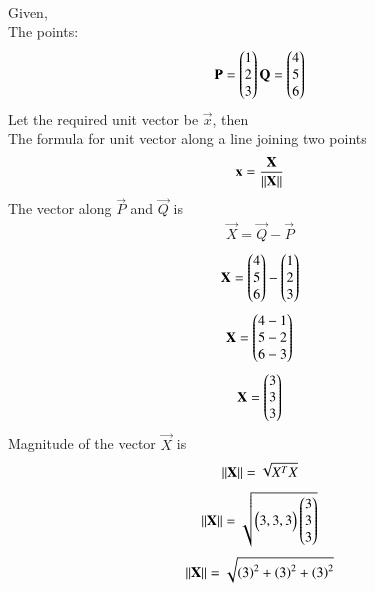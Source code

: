 \documentclass[journal]{IEEEtran}
\begin{document}
         \solution \\
         Given,\\
         The points: 
         \begin{align}
             \mathbf{P}=\begin{pmatrix}1\\2\\3\end{pmatrix} \mathbf{Q}=\begin{pmatrix}4\\5\\6\end{pmatrix}
         \end{align}
         Let the required unit vector be $\vec{x}$, then\\ 
         The formula for unit vector along a line joining two points
         \begin{align}
             \mathbf{{x}}=\frac{\mathbf{X}}{\left\lVert\mathbf{X}\right\rVert}
         \end{align}
         The vector along $\vec{P}$ and $\vec{Q}$ is\\
         \begin{align}
             \vec{X}=\vec{Q}-\vec{P}
         \end{align}
         \begin{align}
             \mathbf{X}=\begin{pmatrix}4\\5\\6\end{pmatrix}-\begin{pmatrix}1\\2\\3\end{pmatrix}
         \end{align}
         \begin{align}
             \mathbf{X}=\begin{pmatrix}4-1\\5-2\\6-3\end{pmatrix}
         \end{align}
         \begin{align}
             \mathbf{X}=\begin{pmatrix}3\\3\\3\end{pmatrix}
         \end{align}
         Magnitude of the vector $\vec{X}$ is\\
         \begin{align}
             \left\lVert\mathbf{X}\right\rVert=\sqrt{X^T X}
         \end{align}
         \begin{align}
             \left\lVert\mathbf{X}\right\rVert=\sqrt{\begin{pmatrix}3,3,3\end{pmatrix}\begin{pmatrix}3\\3\\3\end{pmatrix}}
         \end{align}
         \begin{align}
             \left\lVert\mathbf{X}\right\rVert=\sqrt{\left(3\right)^2+\left(3\right)^2+\left(3\right)^2}
         \end{align}
\end{document}
